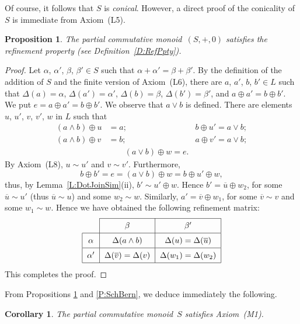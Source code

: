 \documentclass[psamsfonts,reqno]{memo-l}
\theoremstyle{plain}
\newtheorem{proposition}[lemma]{Proposition}
\newtheorem{corollary}[lemma]{Corollary}
\theoremstyle{definition}
\theoremstyle{remark}
\numberwithin{equation}{section}
\newcommand{\oll}[1]{\overline{#1}}
\newcommand{\tvi}{\vrule height 12pt depth 6pt width 0pt}
\newcommand{\pup}[1]{\textup{(}{#1}\textup{)}}
\newcommand{\pcm}{partial commutative mon\-oid}
\newcommand{\DD}{\Delta}
\begin{document}
Of course, it follows that $S$ is \emph{conical}. However, a direct proof of
the conicality of~$S$ is immediate from Axiom~(L5).

\begin{proposition}\label{P:Ref}
The \pcm\ $(S,+,0)$ satisfies the refinement property
\pup{see Definition~\textup{\ref{D:RefPpty}}}.
\end{proposition}

\begin{proof}
Let $\alpha$, $\alpha'$, $\beta$, $\beta'\in S$ such that
$\alpha+\alpha'=\beta+\beta'$. By the definition of the
addition of $S$ and the finite version of Axiom~(L6), there are $a$,
$a'$, $b$, $b'\in L$ such that $\DD(a)=\alpha$, $\DD(a')=\alpha'$,
$\DD(b)=\beta$, $\DD(b')=\beta'$, and $a\oplus a'=b\oplus b'$.
We put $e=a\oplus a'=b\oplus b'$. We observe that $a\vee b$ is defined.
There are elements $u$, $u'$, $v$, $v'$, $w$ in $L$ such that
   \begin{align*}
   (a\wedge b)\oplus u&=a; & b\oplus u'=a\vee b;\\
   (a\wedge b)\oplus v&=b; & a\oplus v'=a\vee b;\\
   &\qquad(a\vee b)\oplus w=e.
   \end{align*}
By Axiom~(L8), $u\sim u'$ and $v\sim v'$. Furthermore,
   \[
   b\oplus b'=e=(a\vee b)\oplus w=b\oplus u'\oplus w,
   \]
thus, by Lemma~\ref{L:DotJoinSim}(ii), $b'\sim u'\oplus w$. Hence
$b'=\oll{u}\oplus w_2$, for some $\oll{u}\sim u'$ (thus
$\oll{u}\sim u$) and some $w_2\sim w$. Similarly,
$a'=\oll{v}\oplus w_1$, for some
$\oll{v}\sim v$ and some $w_1\sim w$. Hence we have obtained the
following refinement matrix:
   \[
   \begin{tabular}{|c|c|c|}
   \cline{2-3}
   \multicolumn{1}{l|}{} & $\beta$ & $\beta'$\tvi\\
   \hline
   $\alpha$ & $\DD(a\wedge b)$ & $\DD(u)=\DD(\oll{u})$\tvi\\
   \hline
   $\alpha'$ & $\DD(\oll{v})=\DD(v)$ & $\DD(w_1)=\DD(w_2)$\tvi\\
   \hline
   \end{tabular}
   \]
This completes the proof.
\end{proof}

{}From Propositions \ref{P:Ref} and \ref{P:SchBern}, we deduce immediately
the following.

\begin{corollary}\label{C:ShasM0}
The \pcm\ $S$ satisfies Axiom~\textup{(M1)}.
\end{corollary}
\end{document}
